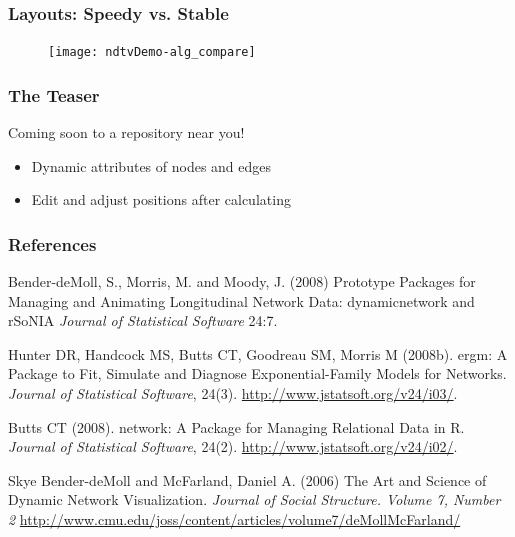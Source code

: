 \documentclass{beamer}
\begin{document}
\begin{frame}[fragile]
\frametitle{Layouts: Speedy vs. Stable}
\begin{figure}
  \centering
\texttt{[image: ndtvDemo-alg\_compare]}

\end{figure}
\end{frame}
\begin{frame}[fragile]


\frametitle{The  Teaser}

Coming soon to a repository near you!
\begin{itemize}
\item Dynamic attributes of nodes and edges
\item Edit and adjust positions after calculating
\end{itemize}




\end{frame}

\begin{frame}[fragile]
\frametitle{References}
\scriptsize{
\begin{thebibliography}{}

Bender-deMoll, S., Morris, M. and Moody, J. (2008)
\newblock Prototype Packages for Managing and Animating Longitudinal Network Data: dynamicnetwork and rSoNIA
\newblock \emph{Journal of Statistical Software} 24:7.

Hunter DR, Handcock MS, Butts CT, Goodreau SM, Morris M (2008b). 
\newblock ergm: A Package to Fit, Simulate and Diagnose Exponential-Family Models for Networks. 
\newblock \emph{Journal of Statistical Software}, 24(3). \url{http://www.jstatsoft.org/v24/i03/}. 

Butts CT (2008). 
\newblock network: A Package for Managing Relational Data in R. 
\newblock \emph{Journal of Statistical Software}, 24(2). \url{http://www.jstatsoft.org/v24/i02/}. 

Skye Bender-deMoll and McFarland, Daniel A. (2006) 
\newblock The Art and Science of Dynamic Network Visualization.
\newblock \emph{Journal of Social Structure. Volume 7, Number 2} \url{http://www.cmu.edu/joss/content/articles/volume7/deMollMcFarland/}

\end{thebibliography}
}
\end{frame}
\end{document}
